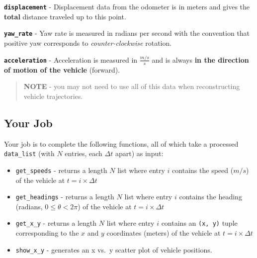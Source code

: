 \documentclass[11pt]{article}
\begin{document}
\textbf{\texttt{displacement}} - Displacement data from the odometer is
in meters and gives the \textbf{total} distance traveled up to this
point.

\textbf{\texttt{yaw\_rate}} - Yaw rate is measured in radians per second
with the convention that positive yaw corresponds to
\emph{counter-clockwise} rotation.

\textbf{\texttt{acceleration}} - Acceleration is measured in
\(\frac{m/s}{s}\) and is always \textbf{in the direction of motion of
the vehicle} (forward).

\begin{quote}
\textbf{NOTE} - you may not need to use all of this data when
reconstructing vehicle trajectories.
\end{quote}

    \hypertarget{your-job}{%
\subsection{Your Job}\label{your-job}}

Your job is to complete the following functions, all of which take a
processed \texttt{data\_list} (with \(N\) entries, each \(\Delta t\)
apart) as input:

\begin{itemize}
\item
  \texttt{get\_speeds} - returns a length \(N\) list where entry \(i\)
  contains the speed (\(m/s\)) of the vehicle at
  \(t = i \times \Delta t\)
\item
  \texttt{get\_headings} - returns a length \(N\) list where entry \(i\)
  contains the heading (radians, \(0 \leq \theta < 2\pi\)) of the
  vehicle at \(t = i \times \Delta t\)
\item
  \texttt{get\_x\_y} - returns a length \(N\) list where entry \(i\)
  contains an \texttt{(x,\ y)} tuple corresponding to the \(x\) and
  \(y\) coordinates (meters) of the vehicle at \(t = i \times \Delta t\)
\item
  \texttt{show\_x\_y} - generates an x vs.~y scatter plot of vehicle
  positions.
\end{itemize}
\end{document}
